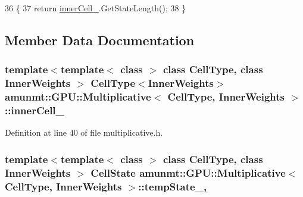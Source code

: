 \begin{DoxyCode}
36                                               \{
37       \textcolor{keywordflow}{return} \hyperlink{classamunmt_1_1GPU_1_1Multiplicative_a365c31555dc63bc9008f39ddd3c3026a}{innerCell\_}.GetStateLength();
38     \}
\end{DoxyCode}


\subsection{Member Data Documentation}
\subsubsection[{\texorpdfstring{inner\+Cell\+\_\+}{innerCell_}}]{\setlength{\rightskip}{0pt plus 5cm}template$<$template$<$ class $>$ class Cell\+Type, class Inner\+Weights $>$ Cell\+Type$<$Inner\+Weights$>$ {\bf amunmt\+::\+G\+P\+U\+::\+Multiplicative}$<$ Cell\+Type, Inner\+Weights $>$\+::inner\+Cell\+\_\+\hspace{0.3cm}{\ttfamily [private]}}\hypertarget{classamunmt_1_1GPU_1_1Multiplicative_a365c31555dc63bc9008f39ddd3c3026a}{}\label{classamunmt_1_1GPU_1_1Multiplicative_a365c31555dc63bc9008f39ddd3c3026a}


Definition at line 40 of file multiplicative.\+h.

\subsubsection[{\texorpdfstring{temp\+State\+\_\+}{tempState_}}]{\setlength{\rightskip}{0pt plus 5cm}template$<$template$<$ class $>$ class Cell\+Type, class Inner\+Weights $>$ {\bf Cell\+State} {\bf amunmt\+::\+G\+P\+U\+::\+Multiplicative}$<$ Cell\+Type, Inner\+Weights $>$\+::temp\+State\+\_\+\hspace{0.3cm}{\ttfamily [mutable]}, {\ttfamily [private]}}\hypertarget{classamunmt_1_1GPU_1_1Multiplicative_ae583681af41e0a7ec9671f14b68b56b8}{}\label{classamunmt_1_1GPU_1_1Multiplicative_ae583681af41e0a7ec9671f14b68b56b8}


